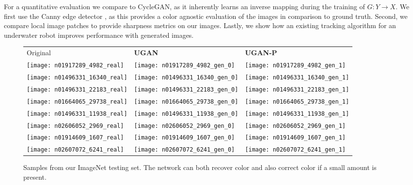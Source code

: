For a quantitative evaluation we compare to CycleGAN, as it inherently learns an inverse mapping during the training of
$G: Y \rightarrow X$. We first use the Canny edge detector
\cite{canny1986computational}, as this provides a color agnostic evaluation of the images in comparison to ground truth.
Second, we compare local image patches to provide sharpness metrics on our images. Lastly, we show how an existing
tracking algorithm for an underwater robot improves performance with generated images.

\begin{figure}[!ht]
\centering
\footnotesize
\begin{tabular}{p{1.6cm} p{1.6cm} p{1.6cm}}
   Original & \textbf{UGAN} & \textbf{UGAN-P} \\
   \texttt{[image: n01917289\_4982\_real]} &
   \texttt{[image: n01917289\_4982\_gen\_0]} &
   \texttt{[image: n01917289\_4982\_gen\_1]} \\

   \texttt{[image: n01496331\_16340\_real]} &
   \texttt{[image: n01496331\_16340\_gen\_0]} &
   \texttt{[image: n01496331\_16340\_gen\_1]} \\
   
   \texttt{[image: n01496331\_22183\_real]} &
   \texttt{[image: n01496331\_22183\_gen\_0]} &
   \texttt{[image: n01496331\_22183\_gen\_1]} \\
   
   \texttt{[image: n01664065\_29738\_real]} &
   \texttt{[image: n01664065\_29738\_gen\_0]} &
   \texttt{[image: n01664065\_29738\_gen\_1]} \\
   
   \texttt{[image: n01496331\_11938\_real]} &
   \texttt{[image: n01496331\_11938\_gen\_0]} &
   \texttt{[image: n01496331\_11938\_gen\_1]} \\
   
   \texttt{[image: n02606052\_2969\_real]} &
   \texttt{[image: n02606052\_2969\_gen\_0]} &
   \texttt{[image: n02606052\_2969\_gen\_1]} \\
   
   \texttt{[image: n01914609\_1607\_real]} &
   \texttt{[image: n01914609\_1607\_gen\_0]} &
   \texttt{[image: n01914609\_1607\_gen\_1]} \\

   \texttt{[image: n02607072\_6241\_real]} &
   \texttt{[image: n02607072\_6241\_gen\_0]} &
   \texttt{[image: n02607072\_6241\_gen\_1]} \\

\end{tabular}
\caption{Samples from our ImageNet testing set. The network can both recover color and also correct color if a small amount is 
present.}
\label{fig:test_samples}
\end{figure}


